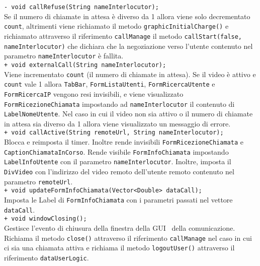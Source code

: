 {\begin{sloppypar}
{{\begin{itemize}
				\texttt{- void callRefuse(String nameInterlocutor);}\\
				Se il numero di chiamate in attesa è diverso da 1 allora viene solo decrementato \texttt{count}, altrimenti viene richiamato il metodo \texttt{graphicInitialCharge()} e richiamato attraverso il riferimento \texttt{callManage} il metodo \texttt{callStart(false, nameInterlocutor)} che dichiara che la negoziazione verso l'utente contenuto nel parametro \texttt{nameInterlocutor} è fallita.\\

				\texttt{+ void externalCall(String nameInterlocutor);}\\
				Viene incrementato \texttt{count} (il numero di chiamate in attesa). Se il video è attivo e \texttt{count} vale 1 allora \texttt{TabBar}, \texttt{FormListaUtenti}, \texttt{FormRicercaUtente} e \texttt{FormRicercaIP} vengono resi 
				invisibili, e viene visualizzato \texttt{FormRicezioneChiamata} impostando ad \texttt{nameInterlocutor} il contenuto di \texttt{LabelNomeUtente}. 
				Nel caso in cui il video non sia attivo o il numero di chiamate in attesa sia diverso da 1 allora viene 
				visualizzato un messaggio di errore.\\

				\texttt{+ void callActive(String remoteUrl, String nameInterlocutor);}\\
				Blocca e reimposta il timer. Inoltre rende invisibili \texttt{FormRicezioneChiamata} e \texttt{CaptionChiamataInCorso}. 
				Rende visibile \texttt{FormInfoChiamata} impostando \texttt{LabelInfoUtente} con il parametro \texttt{nameInterlocutor}. Inoltre, 
				imposta il \texttt{DivVideo} con l'indirizzo del video remoto dell'utente remoto contenuto nel parametro \texttt{remoteUrl}.\\

				\texttt{+ void updateFormInfoChiamata(Vector<Double> dataCall);}\\
				Imposta le Label di \texttt{FormInfoChiamata} con i parametri passati nel vettore \texttt{dataCall}.\\

				\texttt{+ void windowClosing();}\\
				Gestisce l'evento di chiusura della finestra della GUI\g~ della comunicazione. Richiama il metodo \texttt{close()} attraverso il riferimento \texttt{callManage} nel caso in cui ci sia una chiamata attiva e
				richiama il metodo \texttt{logoutUser()} attraverso il riferimento \texttt{dataUserLogic}.\\
				

\end{itemize}}}
\end{sloppypar}}
